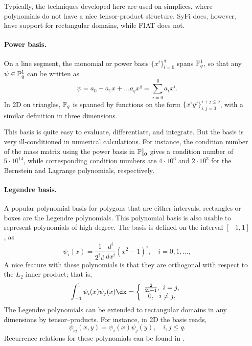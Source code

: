Typically, the techniques developed here are used on simplices, where
polynomials do not have a nice tensor-product structure.  SyFi does,
however, have support for rectangular domains, while FIAT does not.

\paragraph{Power basis.}
On a line segment, the monomial or power basis $\{ x^i \}_{i=0}^{q}$
spans $\P^1_q$, so that any $\psi \in \P^1_q$ can be written as
\begin{equation}
\label{pn1d}
\psi = a_0 + a_1 x + \ldots a_q x^q = \sum^q_{i=0} a_i x^i.
\end{equation}
In 2D on triangles, $\P_q$ is spanned by functions on the form $\{
x^i y^j \}_{i,j=0}^{i+j\leqslant q}$, with a similar definition in three
dimensions.

This basis is quite easy to evaluate, differentiate, and integrate. But
the basis is very ill-conditioned in numerical calculations.
For instance, the condition number of the mass matrix using the power
basis in $\P^1_{10}$ gives a condition number of $5\cdot10^{14}$, while
corresponding condition numbers are $4\cdot 10^6$ and $2\cdot 10^3$
for the Bernstein and Lagrange polynomials, respectively.

\paragraph{Legendre basis.}

A popular polynomial basis for polygons that are either intervals,
rectangles or boxes are the Legendre polynomials.  This polynomial basis
is also usable to represent polynomials of high degree.  The basis is
defined on the interval $[-1,1]$, as
\begin{equation}
\psi_i(x) = \frac{1}{2^i i!} \frac{d^i}{dx^i} (x^2 -1)^i, \quad i=0,1,\ldots,
\end{equation}
A nice feature with these polynomials is that they are orthogonal with
respect to the $L_2$ inner product; that is,
\begin{equation}
\int_{-1}^1 \psi_i (x) \psi_j(x) \dx  =
\left\{
\begin{array}{c}
\frac{2}{2i+1}, \ i=j, \\
0 , \ \ i\not= j, \\
\end{array}
\right.
\end{equation}
The Legendre polynomials can be extended to rectangular domains in any
dimensions by tensor--products.  For instance, in 2D the basis reads,
\begin{equation}
\psi_{ij}(x,y) = \psi_i(x) \psi_j(y) ,   \quad i,j \leqslant q.
\end{equation}
Recurrence relations for these polynomials can be found in
\citet{KarniadakisSherwin2005}.

